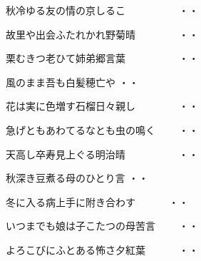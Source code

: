 \vspace{0.6cm}
\begin{shiika}秋冷ゆる友の情の京しるこ　　　　　
\hfill{・・}\end{shiika}
\vspace{0.6cm}
\begin{shiika}故里や出会ふたれかれ野菊晴　　　　
\hfill{・・}\end{shiika}
\vspace{0.6cm}
\begin{shiika}栗むきつ老ひて姉弟郷言葉　　　　　
\hfill{・・}\end{shiika}
\vspace{0.6cm}
\begin{shiika}風のまま吾も白髪穂亡や
\hfill{・・}\end{shiika}
\vspace{0.6cm}
\begin{shiika}花は実に色増す石榴日々親し　　　　
\hfill{・・}\end{shiika}
\vspace{0.6cm}
\begin{shiika}急げともあわてるなとも虫の鳴く　　
\hfill{・・}\end{shiika}
\vspace{0.6cm}
\begin{shiika}天高し卒寿見上ぐる明治晴　　　　　
\hfill{・・}\end{shiika}
\vspace{0.6cm}
\begin{shiika}秋深き豆煮る母のひとり言
\hfill{・・}\end{shiika}
\vspace{0.6cm}
\begin{shiika}冬に入る病上手に附き合わす　　　
\hfill{・・}\end{shiika}
\vspace{0.6cm}
\begin{shiika}いつまでも娘は子こたつの母苦言　　
\hfill{・・}\end{shiika}
\vspace{0.6cm}
\begin{shiika}よろこびにふとある怖さ夕紅葉　　　
\hfill{・・}\end{shiika}
